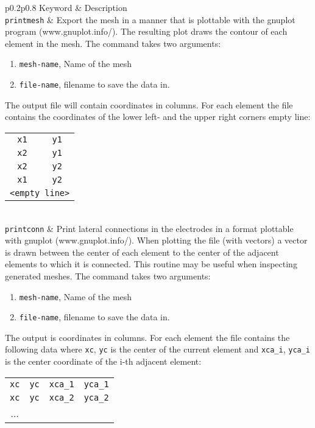 \documentclass[noshowpacs,preprintnumbers,amsmath,amssymb, letter]{revtex4}
\begin{document}
\begin{longtable}{p{}p{}}
\hline
Keyword & Description \\
\texttt{printmesh}	& Export the mesh in a manner that is plottable with the gnuplot program (www.gnuplot.info/). The resulting plot draws the contour of each element in the mesh. The command takes two arguments:
\begin{enumerate}
\item \texttt{mesh-name}, Name of the mesh
\item \texttt{file-name}, filename to save the data in.
\end{enumerate}
The output file will contain coordinates in columns. For each element the file contains the coordinates of the lower left- and the upper right corners empty line:\newline 
\begin{tabular}{cc}
	\texttt{x1} & \texttt{y1} \\
	\texttt{x2} & \texttt{y1} \\
	\texttt{x2} & \texttt{y2} \\
	\texttt{x1} & \texttt{y2} \\
	\multicolumn{2}{l}{\texttt{<empty line>}}\\
\end{tabular}\\
\texttt{printconn}	& Print lateral connections in the electrodes in a format plottable with gnuplot (www.gnuplot.info/). When plotting the file (with vectors) a vector is drawn between the center of each element to the center of the adjacent elements to which it is connected. This routine may be useful when inspecting generated meshes. The command takes two arguments:
\begin{enumerate}
\item \texttt{mesh-name}, Name of the mesh
\item \texttt{file-name}, filename to save the data in.
\end{enumerate}
The output is coordinates in columns. For each element the file contains the following data where \texttt{xc}, \texttt{yc} is the center of the current element and \texttt{xca\_i}, \texttt{yca\_i} is the center coordinate of the i-th adjacent element: 
\begin{tabular}{cccc}
	\texttt{xc} & \texttt{yc} & \texttt{xca\_1} & \texttt{yca\_1} \\
	\texttt{xc} & \texttt{yc} & \texttt{xca\_2} & \texttt{yca\_2} \\
	... \\

\end{tabular}
\end{longtable}
\end{document}
